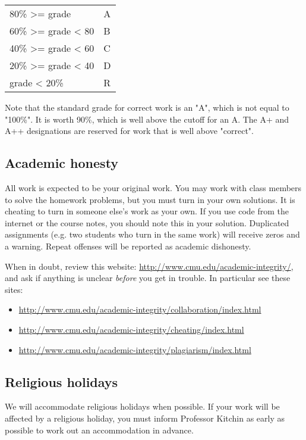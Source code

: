 \documentclass[11pt]{article}
\begin{document}
\begin{center}
\begin{tabular}{ll}
80\% >= grade & A\\
60\% >= grade < 80 & B\\
40\% >= grade < 60 & C\\
20\% >= grade < 40 & D\\
grade < 20\% & R\\
\end{tabular}
\end{center}

Note that the standard grade for correct work is an "A", which is not equal to "100\%". It is worth 90\%, which is well above the cutoff for an A. The A+ and A++ designations are reserved for work that is well above "correct".

\subsection{Academic honesty}
\label{sec:orgheadline11}
All work is expected to be your original work. You may work with class members to solve the homework problems, but you must turn in your own solutions. It is cheating to turn in someone else's work as your own. If you use code from the internet or the course notes, you should note this in your solution. Duplicated assignments (e.g. two students who turn in the same work) will receive zeros and a warning. Repeat offenses will be reported as academic dishonesty.

When in doubt, review this website: \url{http://www.cmu.edu/academic-integrity/}, and ask if anything is unclear \emph{before} you get in trouble. In particular see these sites:
\begin{itemize}
\item \url{http://www.cmu.edu/academic-integrity/collaboration/index.html}
\item \url{http://www.cmu.edu/academic-integrity/cheating/index.html}
\item \url{http://www.cmu.edu/academic-integrity/plagiarism/index.html}
\end{itemize}

\subsection{Religious holidays}
\label{sec:orgheadline12}
We will accommodate religious holidays when possible. If your work will be affected by a religious holiday, you must inform Professor Kitchin as early as possible to work out an accommodation in advance.
\end{document}
